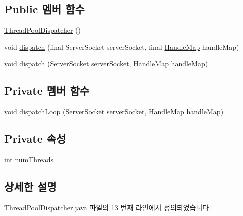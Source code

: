 \subsection*{Public 멤버 함수}
\begin{DoxyCompactItemize}
\item 
\hyperlink{classbasic_server_1_1_thread_pool_dispatcher_a26fda3271602b19753ce6e2d6d9b308a}{Thread\+Pool\+Dispatcher} ()
\item 
void \hyperlink{classbasic_server_1_1_thread_pool_dispatcher_a5311a036b85df65c640d955f253ecc83}{dispatch} (final Server\+Socket server\+Socket, final \hyperlink{classbasic_server_1_1_handle_map}{Handle\+Map} handle\+Map)
\item 
void \hyperlink{interfacebasic_server_1_1_dispatcher_a9a8d3e47b27a6161f8f39bf63fa9e198}{dispatch} (Server\+Socket server\+Socket, \hyperlink{classbasic_server_1_1_handle_map}{Handle\+Map} handle\+Map)
\end{DoxyCompactItemize}
\subsection*{Private 멤버 함수}
\begin{DoxyCompactItemize}
\item 
void \hyperlink{classbasic_server_1_1_thread_pool_dispatcher_a80411d17546dd5ff40af166ef50e2e32}{dispatch\+Loop} (Server\+Socket server\+Socket, \hyperlink{classbasic_server_1_1_handle_map}{Handle\+Map} handle\+Map)
\end{DoxyCompactItemize}
\subsection*{Private 속성}
\begin{DoxyCompactItemize}
\item 
int \hyperlink{classbasic_server_1_1_thread_pool_dispatcher_a0c78b67cc799e2aa23038d96e9bf9af8}{num\+Threads}
\end{DoxyCompactItemize}


\subsection{상세한 설명}


Thread\+Pool\+Dispatcher.\+java 파일의 13 번째 라인에서 정의되었습니다.



